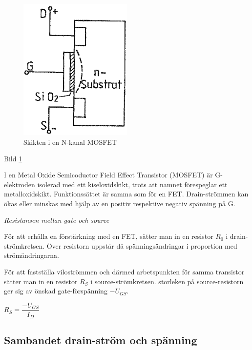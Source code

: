 \begin{figure}
\includegraphics[width=0.5\textwidth]{images/cropped_pdfs/bild_2_2-22.pdf}
\caption{Skikten i en N-kanal MOSFET}
\label{fig:BildII2-22}
\end{figure}


Bild \ref{fig:BildII2-22}


I en Metal Oxide Semicoductor Field Effect Transistor (MOSFET) är
G-elektroden isolerad med ett kiseloxidskikt, trots att namnet förespeglar
ett metalloxidskikt. Funktionssättet är samma som för en FET.
Drain-strömmen kan ökas eller minskas med hjälp av en
positiv respektive negativ spänning på G.

\emph{Resistansen mellan gate och source}

För att erhålla en förstärkning med en FET, sätter man in en resistor
\(R_0\) i drain-strömkretsen. Över resistorn uppstår då spänningsändringar i
proportion med strömändringarna.

För att fastställa viloströmmen och därmed arbetspunkten för samma transistor
sätter man in en resistor \(R_S\) i source-strömkretsen. storleken på
source-resistorn ger sig av önskad gate-förspänning \(-U_{GS}\).

\(R_S = \dfrac{-U_{GS}}{I_D}\)

\subsection{Sambandet drain-ström och spänning}

